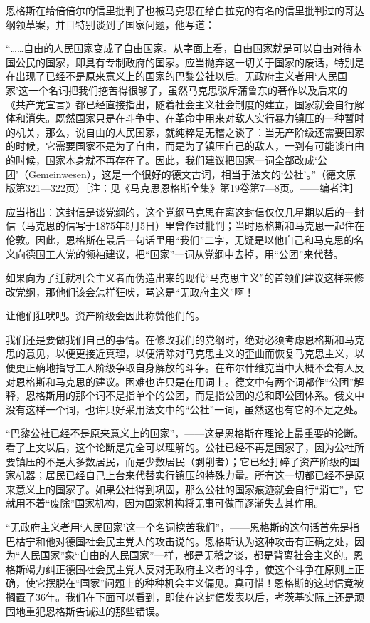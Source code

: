 \documentclass[UTF8, 12pt, a4paper]{ctexrep}
\begin{document}
恩格斯在给倍倍尔的信里批判了也被马克思在给白拉克的有名的信里批判过的哥达纲领草案，并且特别谈到了国家问题，他写道：

“……自由的人民国家变成了自由国家。从字面上看，自由国家就是可以自由对待本国公民的国家，即具有专制政府的国家。应当抛弃这一切关于国家的废话，特别是在出现了已经不是原来意义上的国家的巴黎公社以后。无政府主义者用‘人民国家’这一个名词把我们挖苦得很够了，虽然马克思驳斥蒲鲁东的著作以及后来的《共产党宣言》都已经直接指出，随着社会主义社会制度的建立，国家就会自行解体和消失。既然国家只是在斗争中、在革命中用来对敌人实行暴力镇压的一种暂时的机关，那么，说自由的人民国家，就纯粹是无稽之谈了：当无产阶级还需要国家的时候，它需要国家不是为了自由，而是为了镇压自己的敌人，一到有可能谈自由的时候，国家本身就不再存在了。因此，我们建议把国家一词全部改成‘公团’（Gemeinwesen），这是一个很好的德文古词，相当于法文的‘公社’。”（德文原版第321—322页）［注：见《马克思恩格斯全集》第19卷第7—8页。——编者注］

应当指出：这封信是谈党纲的，这个党纲马克思在离这封信仅仅几星期以后的一封信（马克思的信写于1875年5月5日）里曾作过批判；当时恩格斯和马克思一起住在伦敦。因此，恩格斯在最后一句话里用“我们”二字，无疑是以他自己和马克思的名义向德国工人党的领袖建议，把“国家”一词从党纲中去掉，用“公团”来代替。

如果向为了迁就机会主义者而伪造出来的现代“马克思主义”的首领们建议这样来修改党纲，那他们该会怎样狂吠，骂这是“无政府主义”啊！

让他们狂吠吧。资产阶级会因此称赞他们的。

我们还是要做我们自己的事情。在修改我们的党纲时，绝对必须考虑恩格斯和马克思的意见，以便更接近真理，以便清除对马克思主义的歪曲而恢复马克思主义，以便更正确地指导工人阶级争取自身解放的斗争。在布尔什维克当中大概不会有人反对恩格斯和马克思的建议。困难也许只是在用词上。德文中有两个词都作“公团”解释，恩格斯用的那个词不是指单个的公团，而是指公团的总和即公团体系。俄文中没有这样一个词，也许只好采用法文中的“公社”一词，虽然这也有它的不足之处。

“巴黎公社已经不是原来意义上的国家”，——这是恩格斯在理论上最重要的论断。看了上文以后，这个论断是完全可以理解的。公社已经不再是国家了，因为公社所要镇压的不是大多数居民，而是少数居民（剥削者）；它已经打碎了资产阶级的国家机器；居民已经自己上台来代替实行镇压的特殊力量。所有这一切都已经不是原来意义上的国家了。如果公社得到巩固，那么公社的国家痕迹就会自行“消亡”，它就用不着“废除”国家机构，因为国家机构将无事可做而逐渐失去其作用。

“无政府主义者用‘人民国家’这一个名词挖苦我们”，——恩格斯的这句话首先是指巴枯宁和他对德国社会民主党人的攻击说的。恩格斯认为这种攻击有正确之处，因为“人民国家”象“自由的人民国家”一样，都是无稽之谈，都是背离社会主义的。恩格斯竭力纠正德国社会民主党人反对无政府主义者的斗争，使这个斗争在原则上正确，使它摆脱在“国家”问题上的种种机会主义偏见。真可惜！恩格斯的这封信竟被搁置了36年。我们在下面可以看到，即使在这封信发表以后，考茨基实际上还是顽固地重犯恩格斯告诫过的那些错误。
\end{document}
